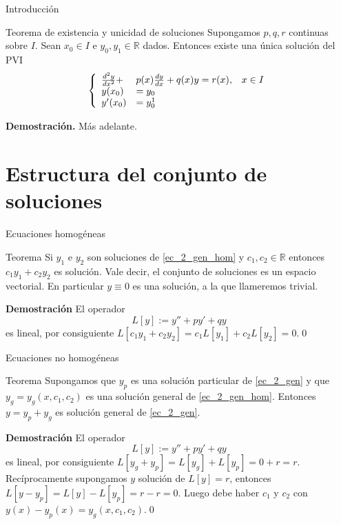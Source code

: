 \documentclass[handout,hyperref={colorlinks=true}]{beamer}
\newcommand{\rr}{\mathbb{R}}
\renewcommand{\emph}[1]{\textcolor[rgb]{1,0,0}{#1}}
\newcommand{\nl}{\onslide<+-> }
\begin{document}
\begin{frame}{Introducción}
\nl \begin{block}{Teorema de existencia y unicidad de soluciones}
 Supongamos $p,q,r$ continuas sobre $I$. Sean $x_0\in I$ e $y_0,y_1\in\rr$ dados. Entonces existe una única solución del PVI
 \[\left\{
 \begin{array}{l l l}
   \frac{d^2y}{dx^2}+&p(x)\frac{dy}{dx}+q(x)y=r(x),&x\in I\\
   y(x_0)&=y_0&\\
   y'(x_0)&=y^1_0&\\ 
  \end{array}\right.
\]


\end{block}
\nl \textbf{Demostración.} Más adelante.
\end{frame}


\section{Estructura del conjunto de soluciones}

\begin{frame}{Ecuaciones homogéneas}
\nl\begin{block}{Teorema}
 Si $y_1$ e $y_2$ son soluciones de \eqref{ec_2_gen_hom} y $c_1,c_2\in\rr$ entonces $c_1y_1+c_2y_2$ es solución. Vale decir, el conjunto de soluciones 
 es un espacio vectorial. En particular $y\equiv 0$ es una solución, a la que llameremos \emph{trivial}.

 

\end{block}

\nl\textbf{Demostración} 
 El operador 
 \[L[y]:=y''+py'+qy\]
es lineal, por consiguiente
$L[c_1y_1+c_2y_2]=c_1L[y_1]+c_2L[y_2]=0.$\qed
\end{frame}



\begin{frame}{Ecuaciones no homogéneas}
\nl\begin{block}{Teorema}
 Supongamos que $y_p$ es una solución particular de \eqref{ec_2_gen} y que $y_g=y_g(x,c_1,c_2)$ es una solución
 general de \eqref{ec_2_gen_hom}. Entonces $y=y_p+y_g$ es solución general de \eqref{ec_2_gen}.
\end{block}

\nl\textbf{Demostración} 
 El operador 
 \[L[y]:=y''+py'+qy\]
es lineal, por consiguiente
$L[y_g+y_p]=L[y_g]+L[y_p]=0+r=r.$
Recíprocamente supongamos $y$ solución de $L[y]=r$, entonces
$L[y-y_p]=L[y]-L[y_p]=r-r=0.$
Luego debe haber $c_1$ y $c_2$ con $y(x)-y_p(x)=y_g(x,c_1,c_2)$.\qed 
 
\end{frame}
\end{document}
